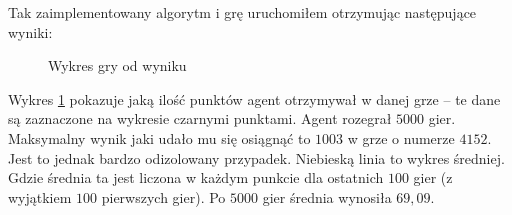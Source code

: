 \documentclass[a4paper, 12pt,oneside]{book}
\begin{document}
Tak zaimplementowany algorytm i grę uruchomiłem otrzymując następujące wyniki:
\begin{figure}[!htb]
	\begin{center}
		
	\end{center}
	\caption{Wykres gry od wyniku}
	\label{plot_first_approach}
\end{figure}

Wykres \ref{plot_first_approach} pokazuje jaką ilość punktów agent otrzymywał w
danej grze -- te dane są zaznaczone na wykresie czarnymi punktami. Agent
rozegrał $5000$ gier. Maksymalny wynik jaki udało mu się osiągnąć to $1003$ w
grze o numerze $4152$. Jest to jednak bardzo odizolowany przypadek. Niebieską
linia to wykres średniej. Gdzie średnia ta jest liczona w każdym punkcie
dla ostatnich $100$ gier (z wyjątkiem $100$ pierwszych gier). Po $5000$ gier
średnia wynosiła $69,09$.
\end{document}
